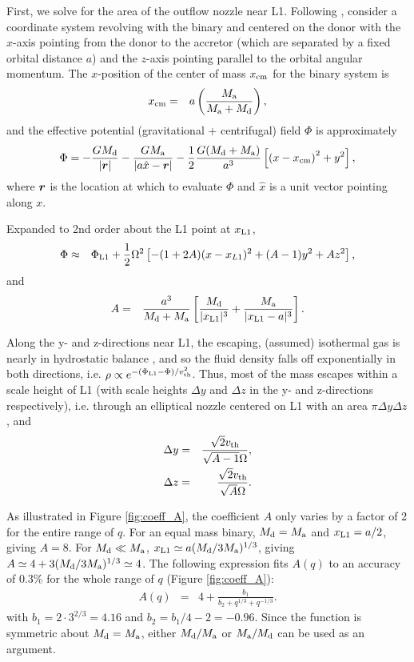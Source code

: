 \documentclass{aastex}
\newcommand{\be}{\begin{eqnarray}}
\newcommand{\ee}{\end{eqnarray}}
\renewcommand{\vec}[1]{\mbox{\boldmath $\displaystyle #1$}}
\begin{document}
First, we solve for the area of the outflow nozzle near L1. Following \citet{1975ApJ...198..383L}, consider a coordinate system revolving with the binary and centered on the donor with the $x$-axis pointing from the donor to the accretor (which are separated by a fixed orbital distance $a$) and the $z$-axis pointing parallel to the orbital angular momentum. The $x$-position of the center of mass $x_{\rm cm}$ for the binary system is
\be
x_{\rm cm} & = & a \left( \frac{M_{\rm a}}{M_{\rm a}+M_{\rm d}} \right), 
\ee
and the effective potential (gravitational + centrifugal) field $\Phi$ is approximately
\be
\Phi = - \frac{GM_{\rm d}}{|\vec{r}|} - \frac{GM_{\rm a}}{| a \hat{x} - \vec{r} |} - \frac{1}{2} \frac{G(M_{\rm d}+M_{\rm a})}{a^3} 
\left[ \left(x - x_{\rm cm}\right)^2 + y^2 \right],
\label{eq:phi_full}
\ee
where $\vec{r}$ is the location at which to evaluate $\Phi$ and $\hat{x}$ is a unit vector pointing along $x$. 

Expanded to 2nd order about the L1 point at $ x_{\rm L1} $,
\be
\Phi & \approx & \Phi_{\rm L1} + \frac{1}{2}\Omega^2 \left[ -(1+2A)(x-x_{L1})^2 + (A-1)y^2 + Az^2 \right],
\label{eq:phi}
\ee
and 
\be
A & = & \frac{a^3}{M_{\rm d}+M_{\rm a}} \left[ \frac{M_{\rm d}}{|x_{\rm L1}|^3} + \frac{M_{\rm a}}{ |x_{\rm L1} - a|^3} \right].
\label{eq:A_exact}
\ee

\noindent Along the y- and z-directions near L1, the escaping, (assumed) isothermal gas is nearly in hydrostatic balance \citep{1975ApJ...198..383L}, and so the fluid density falls off exponentially in both directions, i.e. $\rho \propto e^{-\left( \Phi_{\rm L1} - \Phi \right)/v_{\rm th}^2}$. Thus, most of the mass escapes within a scale height of L1 (with scale heights $\Delta y$ and $\Delta z$ in the y- and z-directions respectively), i.e. through an elliptical nozzle centered on L1 with an area $\pi \Delta y \Delta z$, and 
\be
\Delta y & = & \frac{\sqrt{2} v_{\rm th}}{\sqrt{A-1} \Omega},
\\
\Delta z & = & \frac{\sqrt{2} v_{\rm th}}{\sqrt{A} \Omega}.
\ee

\noindent As illustrated in Figure \ref{fig:coeff_A}, the coefficient $A$ only varies by a factor of 2 for the entire range of $q$. For an equal mass binary, $M_{\rm d}=M_{\rm a}$ and $x_{\rm L1}=a/2$, giving $A=8$. For $M_{\rm d} \ll M_{\rm a}$, $x_{\rm L1} \simeq a (M_{\rm d}/3M_{\rm a})^{1/3}$, giving $A \simeq 4 + 3(M_{\rm d}/3M_{\rm a})^{1/3} \simeq 4$. The following expression fits $A(q)$ to an accuracy of 0.3\% for the whole range of $q$ (Figure \ref{fig:coeff_A}): 
\be
A(q) & = & 4 + \frac{b_1}{b_2 + q^{1/3} + q^{-1/3}}.
\label{eq:A_approx}
\ee
with $b_1=2 \cdot 3^{2/3}=4.16$ and $b_2=b_1/4-2=-0.96$. Since the function is symmetric about $M_{\rm d}=M_{\rm a}$, either $M_{\rm d}/M_{\rm a}$ or $M_{\rm a}/M_{\rm d}$ can be used as an argument.
\end{document}
